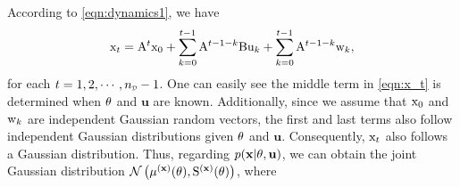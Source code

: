 According to \eqref{eqn:dynamics1}, we have
\begin{equation}\label{eqn:x_t}
    { \mathrm{x} }_t = { \mathrm{A} }^t{ \mathrm{x} }_0 + \sum_{k=0}^{t-1}{ \mathrm{A} }^{t-1-k}{ \mathrm{B} } { \mathrm{u} }_k + \sum_{k=0}^{t-1} { \mathrm{A} }^{t-1-k}{ \mathrm{w} }_k,
\end{equation}
for each $t = 1,2,\cdots, {\nsmD-1}$.
One can easily see the middle term in \eqref{eqn:x_t} is determined when ${ \mathrm{\theta} }$ and $\mathbf{u}$ are known.
Additionally, since we assume that ${ \mathrm{x} }_0$ and ${ \mathrm{w} }_k$ are independent Gaussian random vectors, the first and last terms also follow independent Gaussian distributions given ${ \mathrm{\theta} }$ and $\mathbf{u}$. Consequently, ${ \mathrm{x} }_t$ also follows a Gaussian distribution. Thus, regarding $p(\mathbf{x}|{ \mathrm{\theta} }, \mathbf{u})$, %
we can obtain the joint Gaussian distribution $\mathcal{N}\left(\mu^{(\mathbf{x})}({ \mathrm{\theta} }), { \mathrm{S} }^{(\mathbf{x})}({ \mathrm{\theta} })\right)$, where
